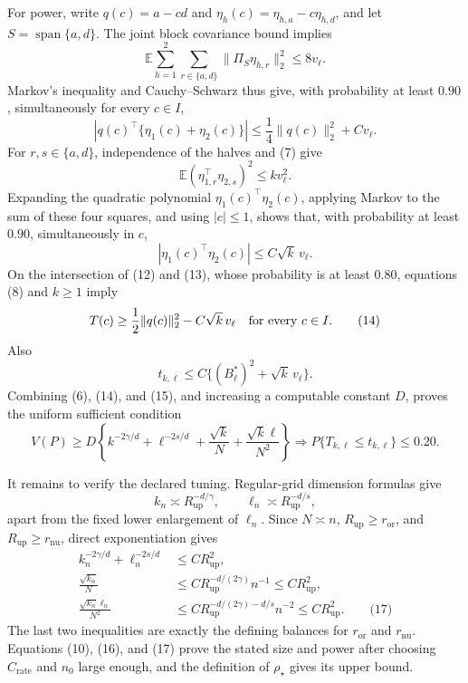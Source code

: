 For power, write \(q(c)=a-cd\) and \(\eta_h(c)=\eta_{h,a}-c\eta_{h,d}\), and let \(S=\operatorname{span}\{a,d\}\).  The joint block covariance bound implies
\[
 \mathbb E\sum_{h=1}^2\sum_{r\in\{a,d\}}
 \|\Pi_S\eta_{h,r}\|_2^2\le8v_\ell. \tag{11}
\]
Markov's inequality and Cauchy--Schwarz thus give, with probability at least \(0.90\), simultaneously for every \(c\in I\),
\[
 |q(c)^\top\{\eta_1(c)+\eta_2(c)\}|
 \le\frac14\|q(c)\|_2^2+C v_\ell. \tag{12}
\]
For \(r,s\in\{a,d\}\), independence of the halves and (7) give
\[
 \mathbb E(\eta_{1,r}^\top\eta_{2,s})^2\le k v_\ell^2.
\]
Expanding the quadratic polynomial \(\eta_1(c)^\top\eta_2(c)\), applying Markov to the sum of these four squares, and using \(|c|\le1\), shows that, with probability at least \(0.90\), simultaneously in \(c\),
\[
 |\eta_1(c)^\top\eta_2(c)|\le C\sqrt{k}\,v_\ell. \tag{13}
\]
On the intersection of (12) and (13), whose probability is at least \(0.80\), equations (8) and \(k\ge1\) imply
\[
 T(c)\ge\frac12\|q(c)\|_2^2-C\sqrt{k}\,v_\ell
 \quad\hbox{for every }c\in I. \tag{14}
\]
Also
\[
 t_{k,\ell}\le C\{(B_\ell^*)^2+\sqrt{k}\,v_\ell\}. \tag{15}
\]
Combining (6), (14), and (15), and increasing a computable constant \(D\), proves the uniform sufficient condition
\[
 V(P)\ge D\left\{k^{-2\gamma/d}+\ell^{-2s/d}
                 +\frac{\sqrt{k}}N+\frac{\sqrt{k}\ell}{N^2}\right\}
 \Longrightarrow P\{T_{k,\ell}\le t_{k,\ell}\}\le0.20. \tag{16}
\]

It remains to verify the declared tuning.  Regular-grid dimension formulas give
\[
 k_n\asymp R_{\mathrm{up}}^{-d/\gamma},
 \qquad \ell_n\asymp R_{\mathrm{up}}^{-d/s},
\]
apart from the fixed lower enlargement of \(\ell_n\).  Since \(N\asymp n\), \(R_{\mathrm{up}}\ge r_{\mathrm{or}}\), and \(R_{\mathrm{up}}\ge r_{\mathrm{nu}}\), direct exponentiation gives
\[
\begin{aligned}
 k_n^{-2\gamma/d}+\ell_n^{-2s/d}&\le C R_{\mathrm{up}}^2,\\
 \frac{\sqrt{k_n}}N
 &\le C R_{\mathrm{up}}^{-d/(2\gamma)}n^{-1}
 \le C R_{\mathrm{up}}^2,\\
 \frac{\sqrt{k_n}\ell_n}{N^2}
 &\le C R_{\mathrm{up}}^{-d/(2\gamma)-d/s}n^{-2}
 \le C R_{\mathrm{up}}^2. \qquad\text{(17)}
\end{aligned}
\]
The last two inequalities are exactly the defining balances for \(r_{\mathrm{or}}\) and \(r_{\mathrm{nu}}\).  Equations (10), (16), and (17) prove the stated size and power after choosing \(C_{\mathrm{rate}}\) and \(n_0\) large enough, and the definition of \(\rho_\star\) gives its upper bound.

